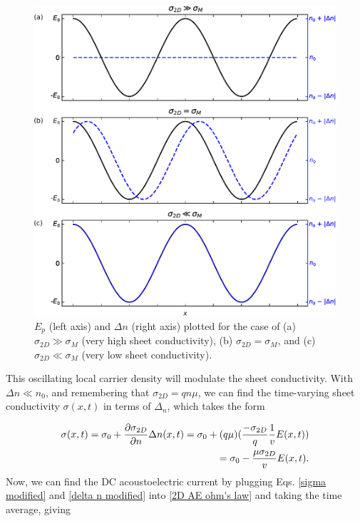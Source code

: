 \documentclass[double,12pt,1in]{beavtex}
\begin{document}
\begin{figure}
    \includegraphics{piezoelectric field and delta n edited.pdf}
    \caption{$E_p$ (left axis) and $\Delta n$ (right axis) plotted for the case of (a) $\sigma_{2D} \gg \sigma_M$ (very high sheet conductivity), (b) $\sigma_{2D} = \sigma_M$, and (c) $\sigma_{2D} \ll \sigma_M$ (very low sheet conductivity).}
    \label{piezoelectric field and delta n}
\end{figure}
This oscillating local carrier density will modulate the sheet conductivity. With $\Delta n \ll n_0$, and remembering that $\sigma_{2D} = q n \mu$, we can find the time-varying  sheet conductivity $\sigma(x,t)$ in terms of $\Delta_n$, which takes the form

\begin{equation}
    \begin{split}
        \sigma(x,t) = \sigma_0 + \pdv{\sigma_{2D}}{n} \Delta n(x,t) = \sigma_0 + (q \mu)(\frac{-\sigma_{2D}}{q} \frac{1}{v}E(x,t)) \\
        = \sigma_0 - \frac{\mu \sigma_{2D}}{v}E(x,t).
    \end{split}
    \label{sigma modified}
\end{equation}
Now, we can find the DC acoustoelectric current by plugging Eqs. \ref{sigma modified} and \ref{delta n modified} into \ref{2D AE ohm's law} and taking the time average, giving
\end{document}
